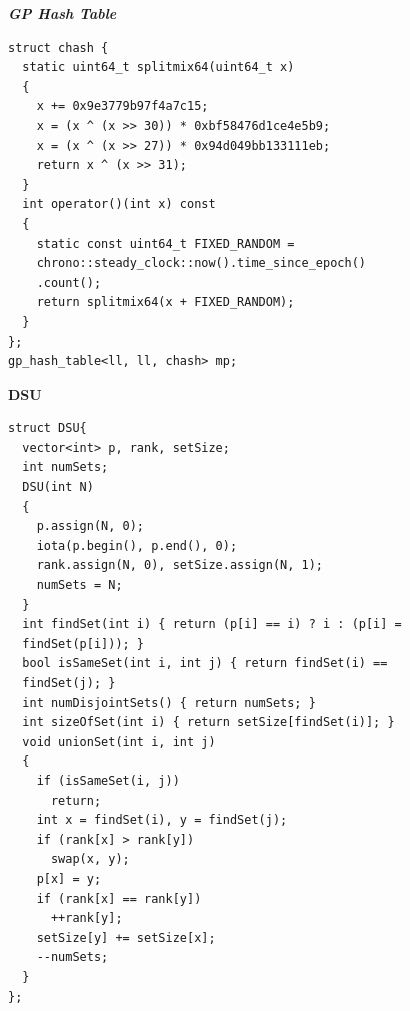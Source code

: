 \switchcolumn

\textbf{\textit{GP Hash Table}}
\begin{lstlisting}
struct chash {
  static uint64_t splitmix64(uint64_t x)
  {
    x += 0x9e3779b97f4a7c15;
    x = (x ^ (x >> 30)) * 0xbf58476d1ce4e5b9;
    x = (x ^ (x >> 27)) * 0x94d049bb133111eb;
    return x ^ (x >> 31);
  }
  int operator()(int x) const
  {
    static const uint64_t FIXED_RANDOM =
    chrono::steady_clock::now().time_since_epoch()
    .count();
    return splitmix64(x + FIXED_RANDOM);
  }
};
gp_hash_table<ll, ll, chash> mp;
\end{lstlisting}

\textbf{DSU}
\begin{lstlisting}
struct DSU{
  vector<int> p, rank, setSize;
  int numSets;
  DSU(int N)
  {
    p.assign(N, 0);
    iota(p.begin(), p.end(), 0);
    rank.assign(N, 0), setSize.assign(N, 1);
    numSets = N;
  }
  int findSet(int i) { return (p[i] == i) ? i : (p[i] =
  findSet(p[i])); }
  bool isSameSet(int i, int j) { return findSet(i) ==
  findSet(j); }
  int numDisjointSets() { return numSets; }
  int sizeOfSet(int i) { return setSize[findSet(i)]; }
  void unionSet(int i, int j)
  {
    if (isSameSet(i, j))
      return;
    int x = findSet(i), y = findSet(j);
    if (rank[x] > rank[y])
      swap(x, y);
    p[x] = y;
    if (rank[x] == rank[y])
      ++rank[y];
    setSize[y] += setSize[x];
    --numSets;
  }
};
\end{lstlisting}

\switchcolumn
